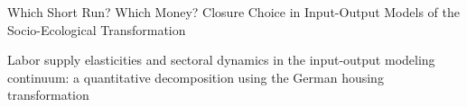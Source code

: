
Which Short Run? Which Money? Closure Choice in Input-Output Models of the Socio-Ecological Transformation


Labor supply elasticities and sectoral dynamics in the input-output modeling continuum: a quantitative decomposition using the German housing transformation

